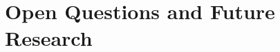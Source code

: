 \section{Open Questions and Future Research}

\pagebreak


\clearpage




\clearpage

\listoffigures

\listoftables


